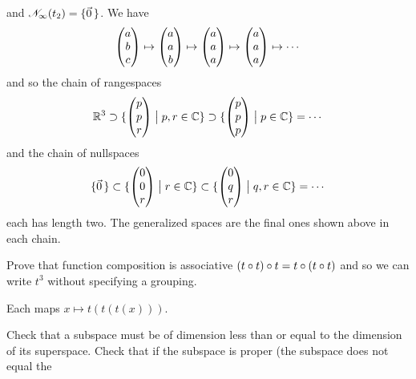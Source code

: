 \begin{exercises}
\begin{answer}
\begin{exparts}
           and $\mathscr{N}_\infty(t_2)=\mbox{$\{\vec{0}\,\}$}$.
         \partsitem We have 
           \begin{equation*}
             \begin{pmatrix} a \\ b \\ c \end{pmatrix}
                \mapsto\begin{pmatrix} a \\ a \\ b \end{pmatrix}
                \mapsto\begin{pmatrix} a \\ a \\ a \end{pmatrix}
                \mapsto\begin{pmatrix} a \\ a \\ a \end{pmatrix}
                \mapsto\cdots
           \end{equation*}
           and so the chain of rangespaces 
           \begin{equation*}
             \mathbb{R}^3
               \supset\mbox{$\{\begin{pmatrix} p \\ p \\ r \end{pmatrix}\bigm| p,r\in\mathbb{C}\}$}
               \supset\mbox{$\{\begin{pmatrix} p \\ p \\ p \end{pmatrix}\bigm| p\in\mathbb{C}\}$}
               =\cdots
           \end{equation*}
           and the chain of nullspaces
           \begin{equation*}
             \mbox{$\{\vec{0}\,\}$}
                \subset\mbox{$\{\begin{pmatrix} 0 \\ 0 \\ r \end{pmatrix}\bigm| r\in \mathbb{C}\}$}
                \subset\mbox{$\{\begin{pmatrix} 0 \\ q \\ r \end{pmatrix}\bigm| q,r\in \mathbb{C}\}$}
                =\cdots
           \end{equation*}
           each has length two.
           The generalized spaces are the final ones shown above in each chain.
      \end{exparts}
     \end{answer}
  \item 
    Prove that function composition is associative
    \( (t\mathbin\circ t)\mathbin\circ t=t\mathbin\circ (t\mathbin\circ t) \)
    and so we can write $t^3$ without specifying a grouping.
    \begin{answer}
      Each maps \( x\mapsto t(t(t(x))) \). 
    \end{answer}
  \item \label{exer:PropSubspStrictLowerDimen}
    Check that a subspace must be of dimension less than or equal to the 
    dimension of its superspace.
    Check that if the subspace is proper (the subspace does not equal the

\end{exercises}
